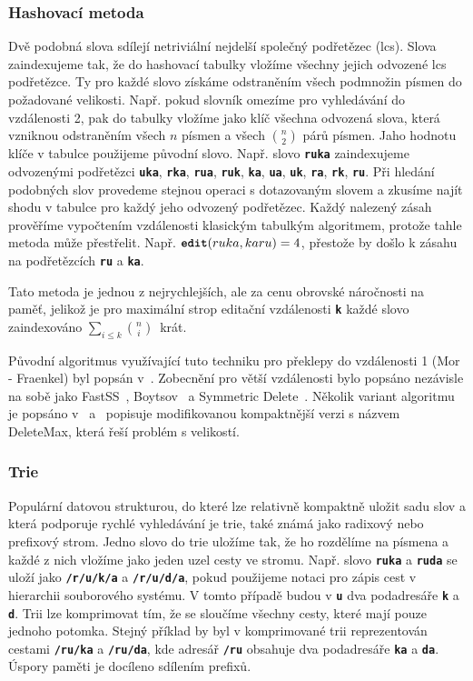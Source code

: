 \documentclass[11pt,letterpaper,oneside,openright]{book}
\newcommand{\bftt}[1]{\texttt{\textbf{#1}}}
\begin{document}
\subsubsection{Hashovací metoda}
Dvě podobná slova sdílejí netriviální nejdelší společný podřetězec (lcs). Slova
zaindexujeme tak, že do hashovací tabulky vložíme všechny jejich odvozené lcs
podřetězce. Ty pro každé slovo získáme odstraněním všech podmnožin písmen do
požadované velikosti. Např. pokud slovník omezíme pro vyhledávání do
vzdálenosti 2, pak do tabulky vložíme jako klíč všechna odvozená slova, která
vzniknou odstraněním všech $n$ písmen a všech ${n \choose 2}$ párů písmen. Jaho
hodnotu klíče v tabulce použijeme původní slovo. Např. slovo \bftt{ruka}
zaindexujeme odvozenými podřetězci \bftt{uka}, \bftt{rka}, \bftt{rua},
\bftt{ruk}, \bftt{ka}, \bftt{ua}, \bftt{uk}, \bftt{ra}, \bftt{rk}, \bftt{ru}.
Při hledání podobných slov provedeme stejnou operaci s dotazovaným slovem a
zkusíme najít shodu v tabulce pro každý jeho odvozený podřetězec. Každý
nalezený zásah prověříme vypočtením vzdálenosti klasickým tabulkým algoritmem,
protože tahle metoda může přestřelit. Např. $\bftt{edit}(ruka, karu) = 4$,
přestože by došlo k zásahu na podřetězcích \bftt{ru} a \bftt{ka}.

Tato metoda je jednou z nejrychlejších, ale za cenu obrovské náročnosti na
paměť, jelikož je pro maximální strop editační vzdálenosti \bftt{k} každé slovo
zaindexováno $\sum_{i \leq k} {n \choose i}$~krát.

Původní algoritmus  využívající tuto techniku pro překlepy do vzdálenosti 1
(Mor - Fraenkel) byl popsán v~\cite{Mor:1982:HCM:358728.358752}. Zobecnění pro
větší vzdálenosti bylo popsáno nezávisle na sobě jako FastSS~\cite{FastSS},
Boytsov~\cite{Boytsov:2011:IMA:1963190.1963191} a Symmetric
Delete~\cite{Faroo_symmetric_delete}. Několik variant algoritmu je popsáno
v~\cite{FastSS} a~\cite{Bast:2013:EFS:2457465.2457470} popisuje modifikovanou
kompaktnější verzi s názvem DeleteMax, která řeší problém s velikostí.

\subsubsection{Trie} \label{sec:trie}
Populární datovou strukturou, do které lze relativně kompaktně uložit sadu slov
a která podporuje rychlé vyhledávání je trie, také známá jako radixový nebo
prefixový strom. Jedno slovo do trie uložíme tak, že ho rozdělíme na písmena a
každé z nich vložíme jako jeden uzel cesty ve stromu. Např. slovo \bftt{ruka} a
\bftt{ruda} se uloží jako \bftt{/r/u/k/a} a \bftt{/r/u/d/a}, pokud použijeme
notaci pro zápis cest v hierarchii souborového systému. V tomto případě budou v
 \bftt{u} dva podadresáře \bftt{k} a \bftt{d}. Trii lze
komprimovat tím, že se sloučíme všechny cesty, které mají pouze jednoho
potomka. Stejný příklad by byl v komprimované trii reprezentován cestami
\bftt{/ru/ka} a \bftt{/ru/da}, kde adresář \bftt{/ru} obsahuje dva podadresáře
\bftt{ka} a \bftt{da}. Úspory paměti je docíleno sdílením prefixů.
\end{document}
